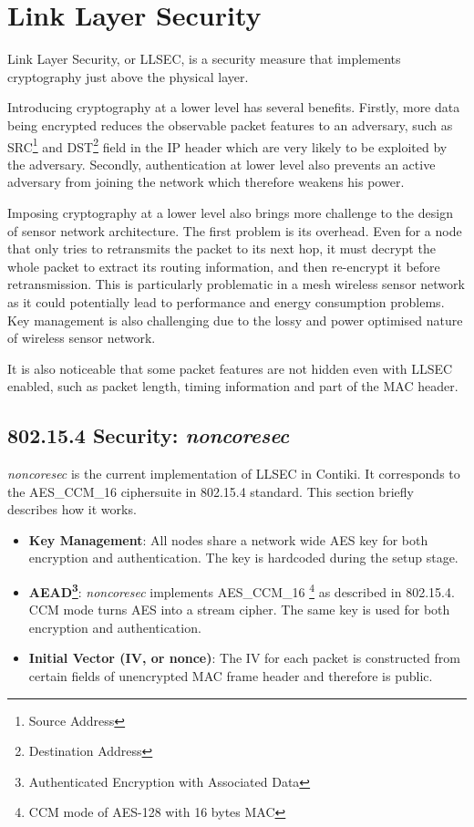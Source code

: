 \chapter{Link Layer Security}

Link Layer Security, or LLSEC, is a security measure that implements cryptography just above the physical layer.

Introducing cryptography at a lower level has several benefits. Firstly, more data being encrypted reduces the observable packet features to an adversary, such as SRC\footnote{Source Address} and DST\footnote{Destination Address} field in the IP header which are very likely to be exploited by the adversary. Secondly, authentication at lower level also prevents an active adversary from joining the network which therefore weakens his power. 

Imposing cryptography at a lower level also brings more challenge to the design of sensor network architecture. The first problem is its overhead. Even for a node that only tries to retransmits the packet to its next hop, it must decrypt the whole packet to extract its routing information, and then re-encrypt it before retransmission. This is particularly problematic in a mesh wireless sensor network as it could potentially lead to performance and energy consumption problems. Key management is also challenging due to the lossy and power optimised nature of wireless sensor network.

It is also noticeable that some packet features are not hidden even with LLSEC enabled, such as packet length, timing information and part of the MAC header.

\section{802.15.4 Security: {\it noncoresec}} \label{sec: noncoresec}
{\it noncoresec}\cite{LLSEC} is the current implementation of LLSEC in Contiki. It corresponds to the AES\_CCM\_16 ciphersuite in 802.15.4 standard. This section briefly describes how it works.

\begin{itemize}
\item {\bf Key Management}: All nodes share a network wide AES key for both encryption and authentication. The key is hardcoded during the setup stage.

\item{\bf AEAD\footnote{Authenticated Encryption with Associated Data}}: {\it noncoresec} implements AES\_CCM\_16 \footnote{CCM mode of AES-128 with 16 bytes MAC} as described in 802.15.4\cite{802154}. CCM mode turns AES into a stream cipher. The same key is used for both encryption and authentication.

\item{\bf Initial Vector (IV, or nonce)}: The IV for each packet is constructed from certain fields of unencrypted MAC frame header and therefore is public.
\end{itemize}

